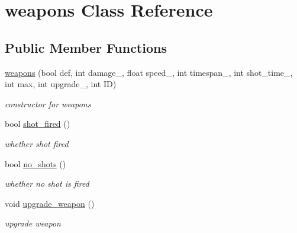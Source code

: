 \hypertarget{classweapons}{\section{weapons Class Reference}
\label{classweapons}
}
\subsection*{Public Member Functions}
\begin{DoxyCompactItemize}
\item 
\hyperlink{classweapons_a39b9cfe1abcf2ba039757d1e46f3fcee}{weapons} (bool def, int damage\+\_\+, float speed\+\_\+, int timespan\+\_\+, int shot\+\_\+time\+\_\+, int max, int upgrade\+\_\+, int I\+D)
\begin{DoxyCompactList}\small\item\em constructor for weapons \end{DoxyCompactList}\item 
bool \hyperlink{classweapons_a5093003cb95b61c667221db6d75a25de}{shot\+\_\+fired} ()
\begin{DoxyCompactList}\small\item\em whether shot fired \end{DoxyCompactList}\item 
bool \hyperlink{classweapons_aa5a172e01e453dd52ea301e98ce44a73}{no\+\_\+shots} ()
\begin{DoxyCompactList}\small\item\em whether no shot is fired \end{DoxyCompactList}\item 
void \hyperlink{classweapons_aa7518f155c755630e65908b1010e1eeb}{upgrade\+\_\+weapon} ()
\begin{DoxyCompactList}\small\item\em upgrade weapon \end{DoxyCompactList}\end{DoxyCompactItemize}

